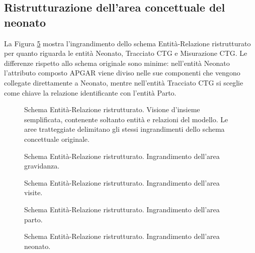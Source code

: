 \subsection{Ristrutturazione dell'area concettuale del neonato}

La Figura \ref{newbornrerdiagram} mostra l'ingrandimento dello schema Entità-Relazione ristrutturato per quanto riguarda le entità Neonato, Tracciato CTG e Misurazione CTG.
Le differenze rispetto allo schema originale sono minime: nell'entità Neonato l'attributo composto APGAR viene diviso nelle sue componenti che vengono collegate direttamente a Neonato, mentre nell'entità Tracciato CTG si sceglie come chiave la relazione identificante con l'entità Parto.

\begin{figure}
    \centering
    
    \caption{Schema Entità-Relazione ristrutturato. Visione d'insieme semplificata, contenente soltanto entità e relazioni del modello. Le aree tratteggiate delimitano gli stessi ingrandimenti dello schema concettuale originale.}
    \label{completererdiagram}
\end{figure}

\begin{figure}
    \centering
    
    \caption{Schema Entità-Relazione ristrutturato. Ingrandimento dell'area gravidanza.}
\label{pregnancyrerdiagram}
\end{figure}

\begin{figure}
    \centering
    
    \caption{Schema Entità-Relazione ristrutturato. Ingrandimento dell'area visite.}
\label{visitsrerdiagram}
\end{figure}

\begin{figure}
    \centering
    
    \caption{Schema Entità-Relazione ristrutturato. Ingrandimento dell'area parto.}
\label{deliveryrerdiagram}
\end{figure}

\begin{figure}
    \centering
    
    \caption{Schema Entità-Relazione ristrutturato. Ingrandimento dell'area neonato.}
\label{newbornrerdiagram}
\end{figure}

